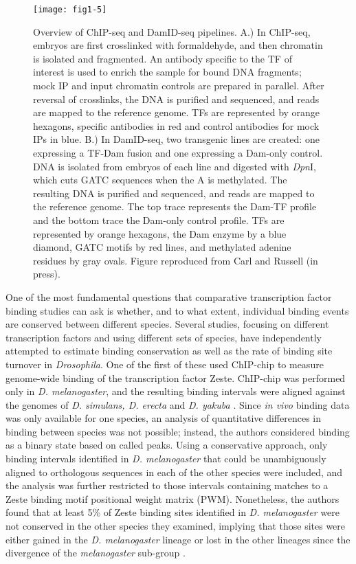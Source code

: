 \begin{figure}
\centering
\texttt{[image: fig1-5]}
\caption[Overview of ChIP-seq and DamID-seq pipelines]{Overview of ChIP-seq and DamID-seq pipelines. A.) In ChIP-seq, embryos are first crosslinked with formaldehyde, and then chromatin is isolated and fragmented. An antibody specific to the TF of interest is used to enrich the sample for bound DNA fragments; mock IP and input chromatin controls are prepared in parallel. After reversal of crosslinks, the DNA is purified and sequenced, and reads are mapped to the reference genome. TFs are represented by orange hexagons, specific antibodies in red and control antibodies for mock IPs in blue. B.) In DamID-seq, two transgenic lines are created: one expressing a TF-Dam fusion and one expressing a Dam-only control. DNA is isolated from embryos of each line and digested with \emph{Dpn}I, which cuts GATC sequences when the A is methylated. The resulting DNA is purified and sequenced, and reads are mapped to the reference genome. The top trace represents the Dam-TF profile and the bottom trace the Dam-only control profile. TFs are represented by orange hexagons, the Dam enzyme by a blue diamond, GATC motifs by red lines, and methylated adenine residues by gray ovals. Figure reproduced from Carl and Russell (in press).}
\label{Figure 1.5}
\end{figure}

One of the most fundamental questions that comparative transcription factor binding studies can ask is whether, and to what extent, individual binding events are conserved between different species. Several studies, focusing on different transcription factors and using different sets of species, have independently attempted to estimate binding conservation as well as the rate of binding site turnover in \emph{Drosophila}. One of the first of these used ChIP-chip to measure genome-wide binding of the transcription factor Zeste. ChIP-chip was performed only in \emph{D. melanogaster}, and the resulting binding intervals were aligned against the genomes of \emph{D. simulans, D. erecta} and \emph{D. yakuba} \citep{moses_large-scale_2006}. Since \emph{in vivo} binding data was only available for one species, an analysis of quantitative differences in binding between species was not possible; instead, the authors considered binding as a binary state based on called peaks. Using a conservative approach, only binding intervals identified in \emph{D. melanogaster} that could be unambiguously aligned to orthologous sequences in each of the other species were included, and the analysis was further restricted to those intervals containing matches to a Zeste binding motif positional weight matrix (PWM). Nonetheless, the authors found that at least 5\% of Zeste binding sites identified in \emph{D. melanogaster} were not conserved in the other species they examined, implying that those sites were either gained in the \emph{D. melanogaster} lineage or lost in the other lineages since the divergence of the \emph{melanogaster} sub-group \citep{moses_large-scale_2006}.

